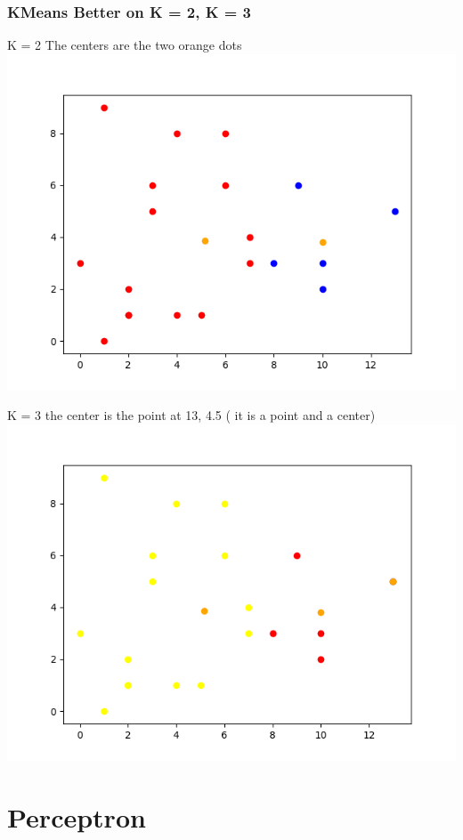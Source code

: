 \documentclass{article}
\begin{document}
	\subsubsection{KMeans Better on K = 2, K = 3}
	\begin{center}
		K = 2 The centers are the two orange dots
		\includegraphics[scale=.8]{KMeans_better_K=2.png}
	\end{center}
	\begin{center}
		K = 3 	the center is the point at 13, 4.5 ( it is a point and a center)
		\includegraphics[scale=.8]{KMeans_better_K=3.png}
	\end{center}

	\section{Perceptron}
\end{document}
